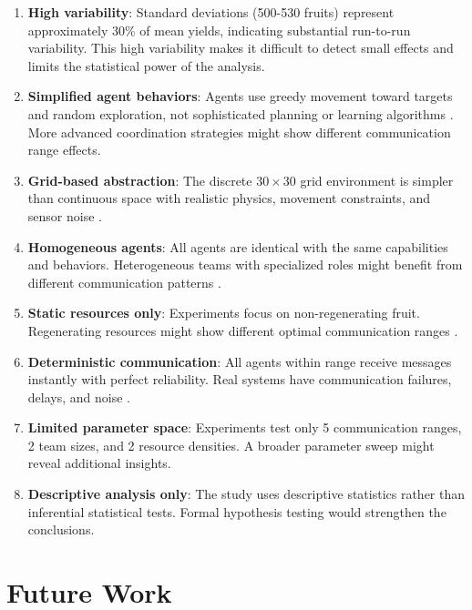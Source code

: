 \begin{enumerate}
    \item \textbf{High variability}: Standard deviations (500-530 fruits) represent approximately 30\% of mean yields, indicating substantial run-to-run variability. This high variability makes it difficult to detect small effects and limits the statistical power of the analysis.

    \item \textbf{Simplified agent behaviors}: Agents use greedy movement toward targets and random exploration, not sophisticated planning or learning algorithms \citep{stone2000multiagent}. More advanced coordination strategies might show different communication range effects.

    \item \textbf{Grid-based abstraction}: The discrete $30 \times 30$ grid environment is simpler than continuous space with realistic physics, movement constraints, and sensor noise \citep{bonabeau2002agent}.

    \item \textbf{Homogeneous agents}: All agents are identical with the same capabilities and behaviors. Heterogeneous teams with specialized roles might benefit from different communication patterns \citep{balch1998behavioral}.

    \item \textbf{Static resources only}: Experiments focus on non-regenerating fruit. Regenerating resources might show different optimal communication ranges \citep{liu2007modeling}.

    \item \textbf{Deterministic communication}: All agents within range receive messages instantly with perfect reliability. Real systems have communication failures, delays, and noise \citep{martorell2024}.

    \item \textbf{Limited parameter space}: Experiments test only 5 communication ranges, 2 team sizes, and 2 resource densities. A broader parameter sweep might reveal additional insights.

    \item \textbf{Descriptive analysis only}: The study uses descriptive statistics rather than inferential statistical tests. Formal hypothesis testing would strengthen the conclusions.
\end{enumerate}

\section{Future Work}

